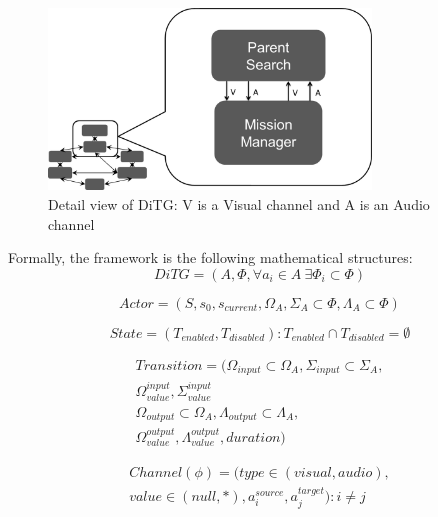 \begin{figure}[h]
\center
\setlength{\abovecaptionskip}{1mm}
\setlength{\belowcaptionskip}{1mm}
\setlength{\textfloatsep}{1mm}
\setlength{\floatsep}{1mm}
\includegraphics[height=1.9in]{ditg_detailed.png}
\caption{Detail view of DiTG: V is a Visual channel and A is an Audio channel}
\label{fig:ditg_detail}
\end{figure}

Formally, the framework is the following mathematical structures:
 \begin{equation}
 	DiTG = (A, \Phi, \forall a_i \in A~ \exists \Phi_i \subset \Phi)
 \end{equation}

 \begin{equation}
 	Actor = (S, s_0, s_{current}, \Omega_A, \Sigma_A \subset \Phi, \Lambda_A
 	\subset \Phi)
 \label{eq:actor}
 \end{equation}

 \begin{equation}
	State = (T_{enabled}, T_{disabled}) : T_{enabled} \cap T_{disabled} = \emptyset
 \label{eq:state}
\end{equation}

\begin{equation}
\begin{split}
	Transition = (\Omega_{input} \subset \Omega_A, \Sigma_{input} \subset \Sigma_A,\\
	\Omega_{value}^{input}, \Sigma_{value}^{input} \\
	\Omega_{output} \subset \Omega_A, \Lambda_{output} \subset \Lambda_A, \\
	\Omega_{value}^{output}, \Lambda_{value}^{output}, duration)
 \label{eq:transition}
 \end{split}
\end{equation}

\begin{equation}
\begin{split}
Channel (\phi) = (type \in (visual, audio), \\
value \in (null, *), 
 a_i^{source}, a_j^{target}) : i \neq j
 \label{eq:channel}
 \end{split}
\end{equation}

